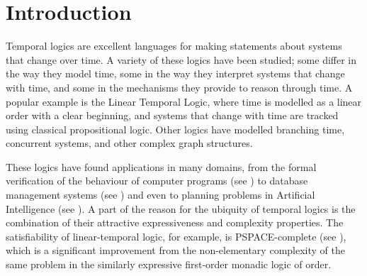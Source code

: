 \documentclass[a4paper,UKenglish,cleveref, autoref, thm-restate, numberwithinsect]{lipics-v2021}
\title{On the Separation of Conditional XPath \and
    \Large M.Sc. Thesis}
\author{V.R. Sathiyanarayana}{
    Chennai Mathematical Institute
    \and Roll number: \textsf{MCS202018}
    \and Advisors: Prof. C. Aiswarya and Prof. Paul Gastin
    \and \url{http://sathiyavrs.netlify.app}}{sathiyanarayana@cmi.ac.in}{}{}%
\begin{document}
\maketitle

\begin{abstract}
    Separation was introduced by Dov Gabbay for the $S, U$ temporal language over linear time and was shown to imply its expressive equivalence with the first-order monadic logic of order. The effectiveness and flexibility of Gabbay's arguments led to the practice of characterizing the expressive power of new temporal logics by attempting to separate them. Accordingly, Maarten Marx proposed a separation property for Conditional XPath, an extension of the XML query language XPath. Conditional XPath can be viewed as a temporal logic over ordered trees, and has been proven to be expressively equivalent to the corresponding first-order language. A mistake in Marx's proof of separation was later discovered, and consequent attempts to fix this mistake have only produced negative results.

    In this thesis, we explore some implications of Marx's work. We show that his arguments can be used to separate a subclass of all formulas. We then describe EF games designed for Conditional XPath, and use these games to characterize the difficulty of separating a particular formula outside this class. We conjecture that this formula cannot be separated. Separately, we justify Marx's partitioning of ordered trees by unexpectedly deriving them.
\end{abstract}

\section{Introduction}
\label{sec:introduction}

Temporal logics are excellent languages for making statements about systems that change over time. A variety of these logics have been studied; some differ in the way they model time, some in the way they interpret systems that change with time, and some in the mechanisms they provide to reason through time. A popular example is the Linear Temporal Logic, where time is modelled as a linear order with a clear beginning, and systems that change with time are tracked using classical propositional logic. Other logics have modelled branching time, concurrent systems, and other complex graph structures.

These logics have found applications in many domains, from the formal verification of the behaviour of computer programs (see \cite{vardiLTL}) to database management systems (see \cite{gabbay1994}) and even to planning problems in Artificial Intelligence (see \cite{planningLTL}). A part of the reason for the ubiquity of temporal logics is the combination of their attractive expressiveness and complexity properties. The satisfiability of linear-temporal logic, for example, is PSPACE-complete (see \cite{vardiLTL}), which is a significant improvement from the non-elementary complexity of the same problem in the similarly expressive first-order monadic logic of order.
\end{document}
